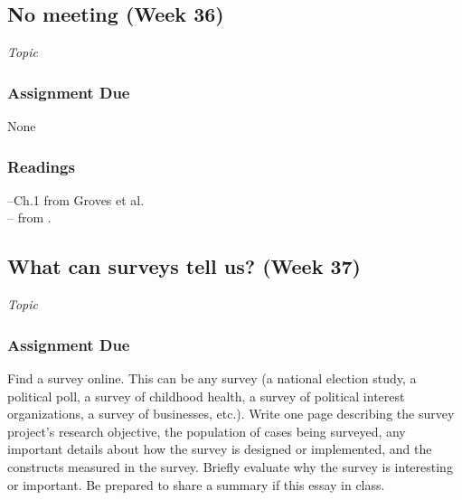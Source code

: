 \documentclass[12pt,a4paper]{article}
\newcommand{\reading}[2][]{\noindent --{#1} from \bibentry{#2}.\vspace{.25em}\\}
\newcommand{\textbook}[2][]{\noindent --{#1} from Groves et al.\vspace{.25em}\\} %
\newcommand{\seealso}{\noindent \emph{See Also:}\\}
\begin{document}
\secttoc

\clearpage





\subsection{No meeting (Week 36)}
\emph{Topic}
\vspace{1em}

\subsubsection*{Assignment Due}
None

\subsubsection*{Readings}
\textbook[Ch.1]{}
\reading{Brady2000} %




\clearpage
\subsection{What can surveys tell us? (Week 37)}
\emph{Topic}


\vspace{1em}
\subsubsection*{Assignment Due}
Find a survey online. This can be any survey (a national election study, a political poll, a survey of childhood health, a survey of political interest organizations, a survey of businesses, etc.). Write one page describing the survey project's research objective, the population of cases being surveyed, any important details about how the survey is designed or implemented, and the constructs measured in the survey. Briefly evaluate why the survey is interesting or important. Be prepared to share a summary if this essay in class.
\end{document}
